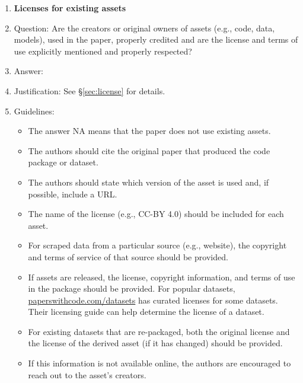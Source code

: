 \documentclass[11pt]{article}
\theoremstyle{plain}
\theoremstyle{definition}
\theoremstyle{remark}
\renewcommand{\^}[1]{^{(#1)}}
\begin{document}
\begin{enumerate}
\item {\bf Licenses for existing assets}
    \item[] Question: Are the creators or original owners of assets (e.g., code, data, models), used in the paper, properly credited and are the license and terms of use explicitly mentioned and properly respected?
    \item[] Answer: \answerYes{} 
    \item[] Justification: See \S\ref{sec:license} for details. 
    \item[] Guidelines:
    \begin{itemize}
        \item The answer NA means that the paper does not use existing assets.
        \item The authors should cite the original paper that produced the code package or dataset.
        \item The authors should state which version of the asset is used and, if possible, include a URL.
        \item The name of the license (e.g., CC-BY 4.0) should be included for each asset.
        \item For scraped data from a particular source (e.g., website), the copyright and terms of service of that source should be provided.
        \item If assets are released, the license, copyright information, and terms of use in the package should be provided. For popular datasets, \url{paperswithcode.com/datasets} has curated licenses for some datasets. Their licensing guide can help determine the license of a dataset.
        \item For existing datasets that are re-packaged, both the original license and the license of the derived asset (if it has changed) should be provided.
        \item If this information is not available online, the authors are encouraged to reach out to the asset's creators.
    \end{itemize}


\end{enumerate}
\end{document}
